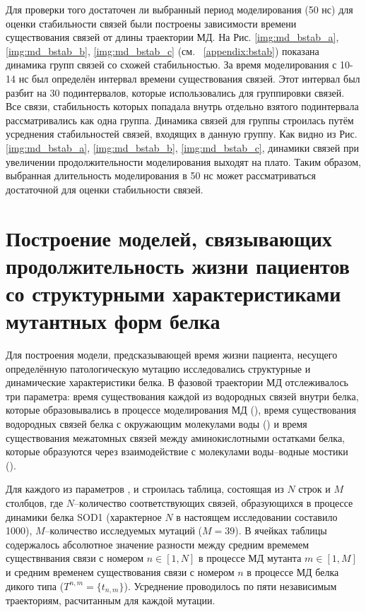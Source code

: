 Для проверки того достаточен ли выбранный период моделирования (50 нс)  для оценки стабильности связей были построены зависимости времени существования связей от длины траектории МД. На Рис. \ref{img:md_bstab_a}, \ref{img:md_bstab_b}, \ref{img:md_bstab_c} (см. \appendixname{}~\ref{appendix:bstab}) показана динамика групп связей со схожей стабильностью. За время моделирования с 10-14 нс был определён интервал времени существования связей. Этот интервал был разбит на 30 подинтервалов, которые использовались для группировки связей. Все связи, стабильность которых попадала внутрь отдельно взятого подинтервала рассматривались как одна группа. Динамика связей для группы строилась путём усреднения стабильностей связей, входящих в данную группу. Как видно из Рис. \ref{img:md_bstab_a}, \ref{img:md_bstab_b}, \ref{img:md_bstab_c}, динамики связей при увеличении продолжительности моделирования  выходят на плато. Таким образом, выбранная длительность моделирования в 50 нс может рассматриваться достаточной для оценки стабильности связей.

\section{Построение моделей, связывающих продолжительность жизни пациентов со структурными характеристиками мутантных форм белка} \label{sect_MD_models}

Для построения модели, предсказывающей время жизни пациента, несущего определённую патологическую мутацию исследовались структурные и динамические характеристики белка. В фазовой траектории МД отслеживалось три параметра:  время существования каждой из водородных связей внутри белка, которые образовывались в процессе моделирования МД (\modelpphb{}), время существования водородных связей белка с окружающим молекулами воды (\modelpwhb{}) и время существования межатомных связей между аминокислотными остатками белка, которые образуются через взаимодействие с молекулами воды--водные мостики (\modelwbr{}).

Для каждого из параметров \modelpphb{}, \modelpwhb{} и \modelwbr{} строилась таблица, состоящая из $N$ строк и $M$ столбцов, где $N$--количество  соответствующих связей, образующихся в процессе динамики белка SOD1 (характерное $N$ в настоящем исследовании составило 1000), $M$--количество исследуемых мутаций ($M = 39$). В ячейках таблицы содержалось абсолютное значение разности между средним времемем существнвания связи с номером $n\in{\left [ 1,N \right ]}$ в процессе МД мутанта $m\in{\left [ 1,M \right ]}$ и средним временем существования связи с номером $n$ в процессе МД белка дикого типа ($T^{n,m}=\lbrace t_{n,m} \rbrace$). Усреднение проводилось по пяти независимым траекториям, расчитанным для каждой мутации.

